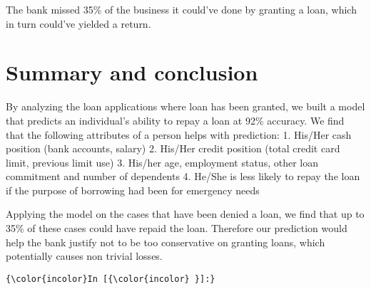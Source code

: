 \documentclass{report}
\begin{document}
The bank missed 35\% of the business it could've done by granting a
loan, which in turn could've yielded a return.

\chapter{Summary and conclusion}\label{summary-and-conclusion}

By analyzing the loan applications where loan has been granted, we built
a model that predicts an individual's ability to repay a loan at 92\%
accuracy. We find that the following attributes of a person helps with
prediction: 1. His/Her cash position (bank accounts, salary) 2. His/Her
credit position (total credit card limit, previous limit use) 3. His/her
age, employment status, other loan commitment and number of dependents
4. He/She is less likely to repay the loan if the purpose of borrowing
had been for emergency needs

Applying the model on the cases that have been denied a loan, we find
that up to 35\% of these cases could have repaid the loan. Therefore our
prediction would help the bank justify not to be too conservative on
granting loans, which potentially causes non trivial losses.

    \begin{Verbatim}[commandchars=\\\{\}]
{\color{incolor}In [{\color{incolor} }]:} 
\end{Verbatim}


    
    
    
    
\end{document}
